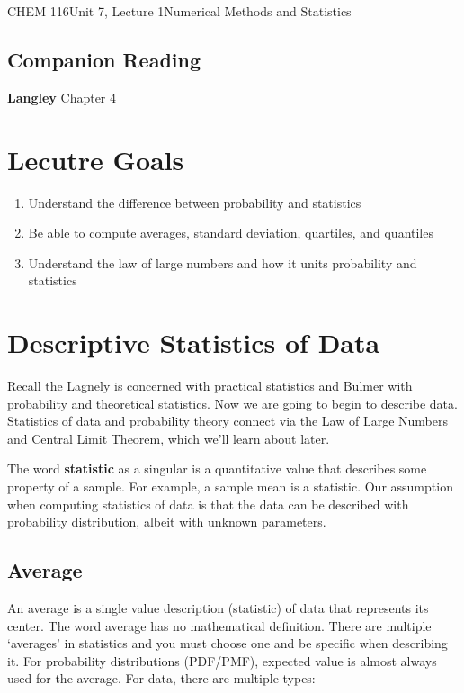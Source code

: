 \documentclass{article}
\begin{document}
\begin{tdoc}{CHEM 116}{Unit 7, Lecture 1}{Numerical Methods and Statistics}

  \subsection*{Companion Reading}
  \textbf{Langley} Chapter 4

  \section{Lecutre Goals}

  \begin{enumerate}
  \item Understand the difference between probability and statistics
  \item Be able to compute averages, standard deviation, quartiles, and quantiles
  \item Understand the law of large numbers and how it units probability and statistics
   
  \end{enumerate}
  

  
\section{Descriptive Statistics of Data}
Recall the Lagnely is concerned with practical statistics and Bulmer
with probability and theoretical statistics. Now we are going to begin
to describe data. Statistics of data and probability
theory connect via the Law of Large Numbers and Central Limit Theorem, which we'll learn about later.

The word {\bf statistic} as a singular is a quantitative value that
describes some property of a sample. For example, a sample mean is a
statistic. Our assumption when computing statistics of data is that the data can be described with probability distribution, albeit with unknown parameters.

\subsection{Average}
An average is a single value description (statistic) of data that represents its
center. The word average has no mathematical definition. There are
multiple `averages' in statistics and you must choose one and be
specific when describing it. For probability distributions (PDF/PMF),
expected value is almost always used for the average. For data, there
are multiple types:


\end{tdoc}
\end{document}
